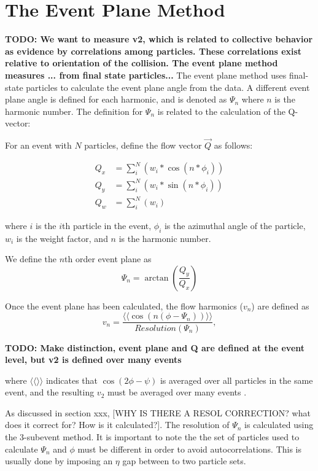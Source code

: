 \section{The Event Plane Method}
\textbf{TODO: We want to measure v2, which is related to collective behavior as evidence by correlations among particles. These correlations exist relative to orientation of the collision. The event plane method measures ... from final state particles...}
The event plane method uses final-state particles to calculate the event plane angle from the data. A different event plane angle is defined for each harmonic, and is denoted as $\Psi_n$ where $n$ is the harmonic number. The definition for $\Psi_n$ is related to the calculation of the Q-vector:

For an event with $N$ particles, define the flow vector $\vec{Q}$ as follows:

\begin{align}
Q_x &= \sum_i^{N}( w_i * \cos(n * \phi_i)) \\
Q_y &= \sum_i^{N}( w_i * \sin(n * \phi_i)) \\
Q_w &= \sum_i^{N}( w_i )
\label{eqn:general_ep_math}
\end{align}

where $i$ is the $i$th particle in the event, $\phi_i$ is the azimuthal angle of the particle, $w_i$ is the weight factor, and $n$ is the harmonic number.

We define the $n$th order event plane as
$$\Psi_n = \arctan \left( \frac{Q_y}{Q_x} \right) $$

Once the event plane has been calculated, the flow harmonics ($v_n$) are defined as
\begin{equation}
v_n = \frac{\langle \langle\cos(n(\phi - \Psi_n))\rangle \rangle}{Resolution(\Psi_n)},
\end{equation}

\textbf{TODO: Make distinction, event plane and Q are defined at the event level, but v2 is defined over many events}

where $\langle \langle \rangle \rangle$ indicates that $\cos(2\phi-\psi)$ is averaged over all particles in the same event, and the resulting $v_2$ must be averaged over many events \cite{PhysRevC.58.1671}. 

As discussed in section xxx, [WHY IS THERE A RESOL CORRECTION? what does it correct for? How is it calculated?]. The resolution of $\Psi_n$ is calculated using the 3-subevent method. It is important to note the the set of particles used to calculate $\Psi_n$ and $\phi$ must be different in order to avoid
autocorrelations. This is usually done by imposing an $\eta$ gap between to two particle sets.

